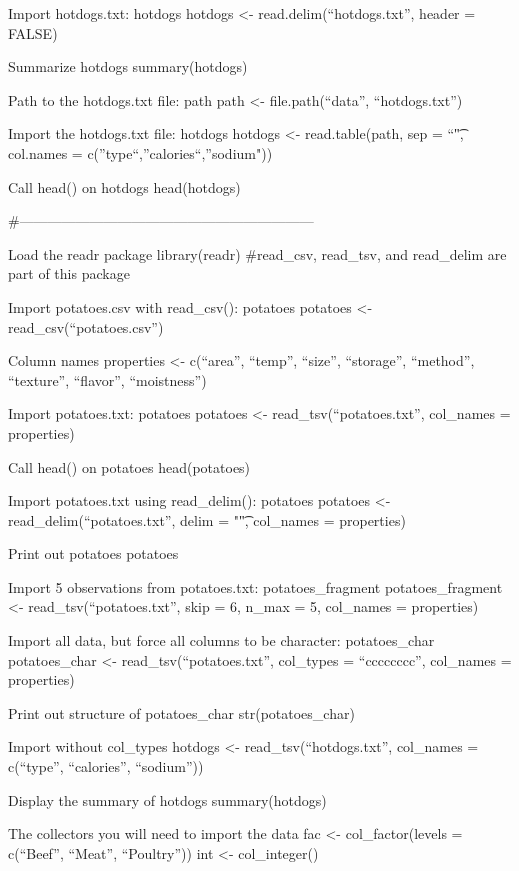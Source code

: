 \documentclass[]{book}
\begin{document}
Import hotdogs.txt: hotdogs
hotdogs \textless{}- read.delim(``hotdogs.txt'', header = FALSE)

Summarize hotdogs
summary(hotdogs)

Path to the hotdogs.txt file: path
path \textless{}- file.path(``data'', ``hotdogs.txt'')

Import the hotdogs.txt file: hotdogs
hotdogs \textless{}- read.table(path,
sep = ``\t",
col.names = c(''type``,''calories``,''sodium"))

Call head() on hotdogs
head(hotdogs)

\#---------------------------------------------------------------

Load the readr package
library(readr) \#read\_csv, read\_tsv, and read\_delim are part of this package

Import potatoes.csv with read\_csv(): potatoes
potatoes \textless{}- read\_csv(``potatoes.csv'')

Column names
properties \textless{}- c(``area'', ``temp'', ``size'', ``storage'', ``method'',
``texture'', ``flavor'', ``moistness'')

Import potatoes.txt: potatoes
potatoes \textless{}- read\_tsv(``potatoes.txt'', col\_names = properties)

Call head() on potatoes
head(potatoes)

Import potatoes.txt using read\_delim(): potatoes
potatoes \textless{}- read\_delim(``potatoes.txt'', delim = "\t", col\_names = properties)

Print out potatoes
potatoes

Import 5 observations from potatoes.txt: potatoes\_fragment
potatoes\_fragment \textless{}- read\_tsv(``potatoes.txt'', skip = 6, n\_max = 5, col\_names = properties)

Import all data, but force all columns to be character: potatoes\_char
potatoes\_char \textless{}- read\_tsv(``potatoes.txt'', col\_types = ``cccccccc'', col\_names = properties)

Print out structure of potatoes\_char
str(potatoes\_char)

Import without col\_types
hotdogs \textless{}- read\_tsv(``hotdogs.txt'', col\_names = c(``type'', ``calories'', ``sodium''))

Display the summary of hotdogs
summary(hotdogs)

The collectors you will need to import the data
fac \textless{}- col\_factor(levels = c(``Beef'', ``Meat'', ``Poultry''))
int \textless{}- col\_integer()
\end{document}
